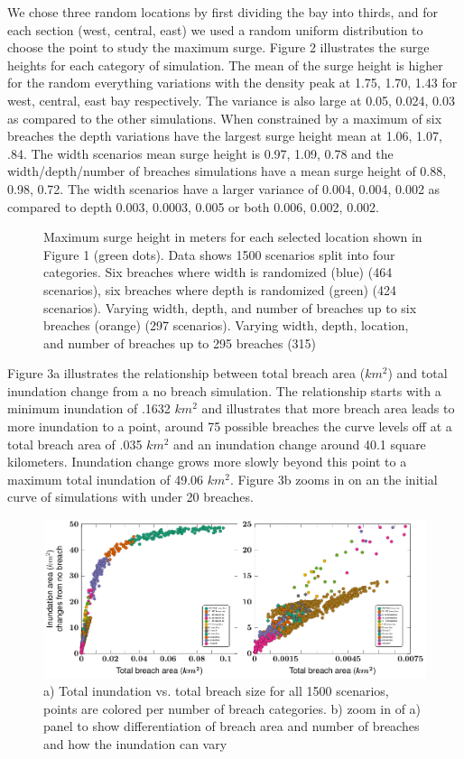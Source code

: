 \documentclass{coastal_paper}
\begin{document}
We chose three random locations by first dividing the bay into thirds, and for each section (west, central, east) we used a random uniform distribution to choose the point to study the maximum surge. Figure 2 illustrates the surge heights for each category of simulation. The mean of the surge height is higher for the random everything variations with the density peak at 1.75, 1.70, 1.43 for west, central, east bay respectively. The variance is also large at 0.05, 0.024, 0.03 as compared to the other simulations. When constrained by a maximum of six breaches the depth variations have the largest surge height mean at 1.06, 1.07, .84. The width scenarios mean surge height is 0.97, 1.09, 0.78 and the width/depth/number of breaches simulations have a mean surge height of 0.88, 0.98, 0.72. The width scenarios have a larger variance of 0.004, 0.004, 0.002 as compared to depth 0.003, 0.0003, 0.005 or both 0.006, 0.002, 0.002. 

\begin{figure}[ht]
    \centering
    \resizebox{\textwidth}{!}{%
            
        }
    \caption{Maximum surge height in meters for each selected location shown in Figure 1 (green dots). Data shows 1500 scenarios split into four categories. Six breaches where width is randomized (blue) (464 scenarios), six breaches where depth is randomized (green) (424 scenarios). Varying width, depth, and number of breaches up to six breaches (orange) (297 scenarios). Varying width, depth, location, and number of breaches up to 295 breaches (315)}
    \label{fig:2}
\end{figure}

Figure 3a illustrates the relationship between total breach area ($km^2$) and total inundation change from a no breach simulation. The relationship starts with a minimum inundation of .1632 $km^2$ and illustrates that more breach area leads to more inundation to a point, around 75 possible breaches the curve levels off at a total breach area of .035 $km^2$ and an inundation change around 40.1 square kilometers. Inundation change grows more slowly beyond this point to a maximum total inundation of 49.06 $km^2$. Figure 3b zooms in on an the initial curve of simulations with under 20 breaches.  

\begin{figure}[ht]
    \centering
    \includegraphics[width=\textwidth]{fig3.pdf}
    \caption{a) Total inundation vs. total breach size for all 1500 scenarios, points are colored per number of breach categories. b) zoom in of a) panel to show differentiation of breach area and number of breaches and how the inundation can vary}
    \label{fig:3}
\end{figure}
\end{document}
